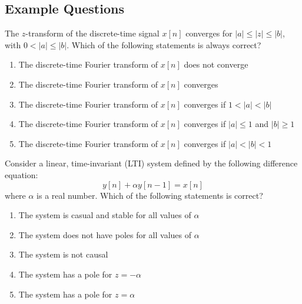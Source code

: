\subsection{Example Questions}
\begin{q}{}
The $z$-transform of the discrete-time signal $x[n]$ converges for $\lvert a \rvert \leq \lvert z \rvert \leq \lvert b \rvert$, with $0 < \lvert a \rvert \leq \lvert b \rvert$. Which of the following statements is always correct?

\begin{enumerate}[label=(\alph*)]
    \item The discrete-time Fourier transform of $x[n]$ does not converge
    \item The discrete-time Fourier transform of $x[n]$ converges
    \item The discrete-time Fourier transform of $x[n]$ converges if $1 < \lvert a \rvert < \lvert b \rvert$
    \item The discrete-time Fourier transform of $x[n]$ converges if $\lvert a \rvert \leq 1$ and $\lvert b \rvert \geq 1$
    \item The discrete-time Fourier transform of $x[n]$ converges if $\lvert a \rvert < \lvert b \rvert < 1$
\end{enumerate}
\end{q}
\begin{q}{}
Consider a linear, time-invariant (LTI) system defined by the following difference equation:
\[
    y[n] + \alpha y[n-1] = x[n]
\]
where $\alpha$ is a real number. Which of the following statements is correct?

\begin{enumerate}[label=(\alph*)]
    \item The system is casual and stable for all values of $\alpha$
    \item The system does not have poles for all values of $\alpha$
    \item The system is not causal
    \item The system has a pole for $z=-\alpha$
    \item The system has a pole for $z=\alpha$
\end{enumerate}
\end{q}
